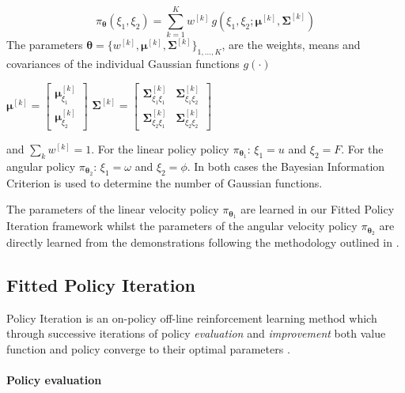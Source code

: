 \documentclass[final,5p,times,twocolumn]{elsarticle}
\newcommand{\SigK}{\boldsymbol{\Sigma}^{[k]}}
\newcommand{\MuK}{\boldsymbol{\mu}^{[k]}}
\newcommand{\piK}{w^{[k]}}
\newcommand{\Param}{\boldsymbol{\theta}}
\begin{document}
\begin{equation}
 \pi_{\Param}(\xi_1,\xi_2) = \sum\limits_{k=1}^{K} \piK \, g(\xi_1,\xi_2;\MuK,\SigK) \label{eq:GMM}
\end{equation}
The parameters $\Param = \{w^{[k]},\MuK,\SigK\}_{1,\dots,K}$, are the weights, means and covariances 
of the individual Gaussian functions $g(\cdot)$
\begin{center}
$\MuK =  \begin{bmatrix} \MuK_{\xi_1} \\ \MuK_{\xi_2} \end{bmatrix}$\hspace*{0.5cm}
$\SigK =  \begin{bmatrix} 
	  \SigK_{\xi_1\xi_1} & \SigK_{\xi_1\xi_2} \\
	  \SigK_{\xi_2\xi_1} & \SigK_{\xi_2\xi_2}
	  \end{bmatrix}$
\end{center}
and $\sum_{k} w^{[k]} = 1$. For the linear policy policy $\pi_{\Param_1}$: ${\xi_1 = u}$ and ${\xi_2 = F}$.
For the angular policy $\pi_{\Param_2}$: ${\xi_1 = \omega}$ and ${\xi_2 = \phi}$. In both cases the Bayesian Information Criterion is used to 
determine the number of Gaussian functions.

The parameters of the linear velocity policy $\pi_{\Param_1}$ are learned in our Fitted Policy Iteration framework
whilst the parameters of the angular velocity policy $\pi_{\Param_2}$ are directly learned from the demonstrations following 
the methodology outlined in \cite[Chap. 5]{Kronander2015}. 

\subsection{Fitted Policy Iteration}\label{sec:FPI}

Policy Iteration is an on-policy off-line reinforcement learning method which through successive iterations of policy \textit{evaluation} 
and \textit{improvement} both value function and policy converge to their optimal parameters \cite[Chap. 4.6]{sutton1998reinforcement}.

\paragraph{Policy evaluation}
\end{document}
